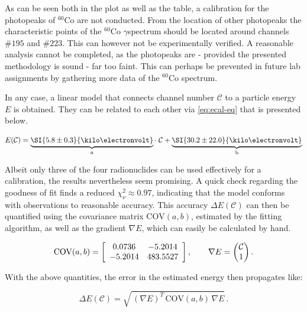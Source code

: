 

As can be seen both in the plot as well as the table, a calibration for the
photopeaks of $^{60}$Co are not conducted. From the location of other photopeaks the
characteristic points of the $^{60}$Co $\gamma$spectrum should be located around
channels $\#195$ and $\#223$. This can however not be experimentally verified. A
reasonable analysis cannot be completed, as the photopeaks are - provided the
presented methodology is sound - far too faint. This can perhaps be prevented in 
future lab assignments by gathering more data of the $^{60}$Co spectrum.

In any case, a linear model that connects channel number $\mathcal{C}$ to a particle
energy $E$ is obtained. They can be related to each other via \autoref{eq:ecal-eq}
that is presented below.

\begin{equation}
\label{eq:ecal-eq}
	E(\mathcal{C}) = \underbrace{\SI{5.8\pm0.3}{\kilo\electronvolt}}_\text{a}\cdot\;\mathcal{C} + \underbrace{\SI{30.2\pm22.0}{\kilo\electronvolt}}_\text{b}
\end{equation}

Albeit only three of the four radionuclides can be used effectively for a
calibration, the results nevertheless seem promising. A quick check regarding the
goodness of fit finds a reduced $\chi^{2}_\nu\approx0.97$, indicating that the model
conforms with observations to reasonable accuracy. This accuracy $\Delta E
(\mathcal{C})$ can then be quantified using the covariance matrix $\text{COV}(a,b)$, 
estimated by the fitting algorithm, as well as the gradient $\nabla E$, which can
easily be calculated by hand.

\begin{equation}
	\text{COV}(a,b) =
	\left[
	\begin{array}{c c}
	0.0736 & -5.2014 \\
	-5.2014 & 483.5527
	\end{array}
	\right],
	\qquad\nabla E = \begin{pmatrix}\mathcal{C}\\1\end{pmatrix}.
\end{equation}

With the above quantities, the error in the estimated energy then propagates like:

\begin{equation}
\label{eq:energy-error}
	\Delta E(\mathcal{C}) = \sqrt{\,(\nabla E)^{T}\,\text{COV}(a,b)\,\nabla E}\,.
\end{equation}
